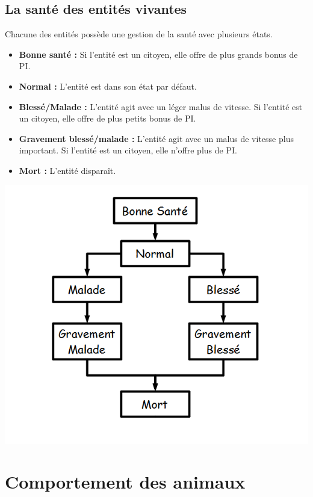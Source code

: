 \documentclass[a4paper]{article}
\newcommand{\alinea}{\hspace*{0.5cm}}
\begin{document}
      \subsection{La santé des entités vivantes}
        \alinea Chacune des entités possède une gestion de la santé avec plusieurs états.
        \begin{itemize} \small
          \item \textbf{Bonne santé :} Si l'entité est un citoyen, elle offre de plus grands bonus de PI.
          \item \textbf{Normal :} L'entité est dans son état par défaut.
          \item \textbf{Blessé/Malade :} L'entité agit avec un léger malus de vitesse. Si l'entité est un citoyen, elle offre de plus petits bonus de PI.
          \item \textbf{Gravement blessé/malade :} L'entité agit avec un malus de vitesse plus important. Si l'entité est un citoyen, elle n'offre plus de PI.
          \item \textbf{Mort :} L'entité disparaît.
        \end{itemize} \normalsize
        \label{DiagSante}
        \begin{center}
          \includegraphics[scale=0.5]{DiagrammeTransitionSante.png} 
        \end{center}
        
    \section{Comportement des animaux}
\end{document}
